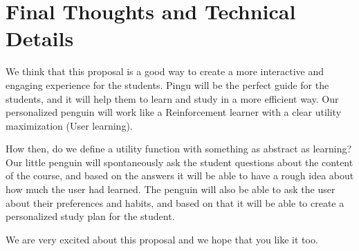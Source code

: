 \documentclass{report}
\begin{document}
\section{Final Thoughts and Technical Details}
We think that this proposal is a good way to create a more interactive and engaging experience for the students. Pingu will be the perfect guide for the students, and it will help them to learn and study in a more efficient way. Our personalized penguin will work like a Reinforcement learner with a clear utility maximization (User learning).

How then, do we define a utility function with something as abstract as learning? Our little penguin will spontaneously ask the student questions about the content of the course, and based on the answers it will be able to have a rough idea about how much the user had learned. The penguin will also be able to ask the user about their preferences and habits, and based on that it will be able to create a personalized study plan for the student.

We are very excited about this proposal and we hope that you like it too.
\end{document}
